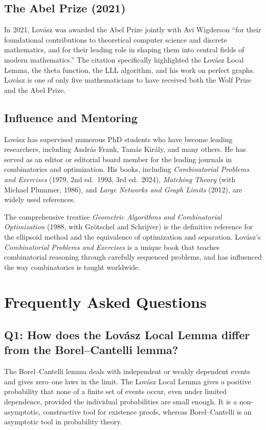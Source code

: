 \subsection{The Abel Prize (2021)}
In 2021, Lov\'{a}sz was awarded the Abel Prize jointly with Avi Wigderson ``for their foundational contributions to theoretical computer science and discrete mathematics, and for their leading role in shaping them into central fields of modern mathematics.'' The citation specifically highlighted the Lov\'{a}sz Local Lemma, the theta function, the LLL algorithm, and his work on perfect graphs. Lov\'{a}sz is one of only five mathematicians to have received both the Wolf Prize and the Abel Prize.

\subsection{Influence and Mentoring}
Lov\'{a}sz has supervised numerous PhD students who have become leading researchers, including Andr\'{a}s Frank, Tam\'{a}s Kir\'{a}ly, and many others. He has served as an editor or editorial board member for the leading journals in combinatorics and optimization. His books, including \textit{Combinatorial Problems and Exercises} (1979, 2nd ed.\ 1993, 3rd ed.\ 2024), \textit{Matching Theory} (with Michael Plummer, 1986), and \textit{Large Networks and Graph Limits} (2012), are widely used references.

The comprehensive treatise \textit{Geometric Algorithms and Combinatorial Optimization} (1988, with Gr\"{o}tschel and Schrijver) is the definitive reference for the ellipsoid method and the equivalence of optimization and separation. Lov\'{a}sz's \textit{Combinatorial Problems and Exercises} is a unique book that teaches combinatorial reasoning through carefully sequenced problems, and has influenced the way combinatorics is taught worldwide.

\section{Frequently Asked Questions}

\subsection*{Q1: How does the Lov\'{a}sz Local Lemma differ from the Borel--Cantelli lemma?}

The Borel--Cantelli lemma deals with independent or weakly dependent events and gives zero--one laws in the limit. The Lov\'{a}sz Local Lemma gives a positive probability that none of a finite set of events occur, even under limited dependence, provided the individual probabilities are small enough. It is a non-asymptotic, constructive tool for existence proofs, whereas Borel--Cantelli is an asymptotic tool in probability theory.

